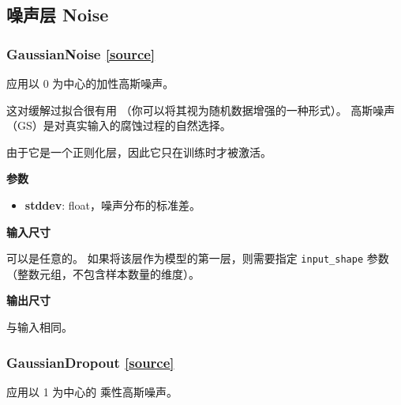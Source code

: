 \subsection{噪声层 Noise}
    
\subsubsection{GaussianNoise {\href{https://github.com/keras-team/keras/blob/master/keras/layers/noise.py\#L14}{{[}source{]}}}}

\begin{Shaded}
\begin{Highlighting}[]
\end{Highlighting}
\end{Shaded}

应用以 0 为中心的加性高斯噪声。

这对缓解过拟合很有用 （你可以将其视为随机数据增强的一种形式）。
高斯噪声（GS）是对真实输入的腐蚀过程的自然选择。

由于它是一个正则化层，因此它只在训练时才被激活。

\textbf{参数}

\begin{itemize}
\tightlist
\item
  \textbf{stddev}: float，噪声分布的标准差。
\end{itemize}

\textbf{输入尺寸}

可以是任意的。 如果将该层作为模型的第一层，则需要指定
\texttt{input\_shape} 参数 （整数元组，不包含样本数量的维度）。

\textbf{输出尺寸}

与输入相同。




\subsubsection{GaussianDropout {\href{https://github.com/keras-team/keras/blob/master/keras/layers/noise.py\#L58}{{[}source{]}}}}

\begin{Shaded}
\begin{Highlighting}[]
\end{Highlighting}
\end{Shaded}

应用以 1 为中心的 乘性高斯噪声。


